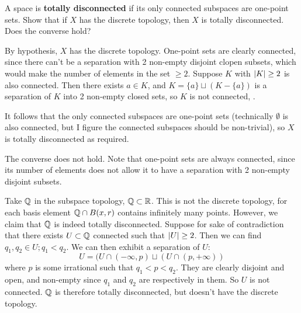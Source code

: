 \documentclass[a4paper, 12pt]{article}
\begin{document}
\begin{problem} 
    A space is \textbf{totally disconnected} if its only connected subspaces are one-point sets. Show that if $X$ has the discrete topology, then $X$ is totally disconnected. Does the converse hold?
\end{problem}
\begin{solution}
    By hypothesis, $X$ has the discrete topology. One-point sets are clearly connected, since there can't be a separation with 2 non-empty disjoint clopen subsets, which would make the number of elements in the set $\geq 2$. Suppose $K$ with $\lvert K\rvert \geq 2$ is also connected. Then there exists $a \in K$, and $K = \{a\} \sqcup (K - \{a\})$ is a separation of $K$ into 2 non-empty closed sets, so $K$ is not connected, \contra.

    It follows that the only connected subspaces are one-point sets (technically $\emptyset$ is also connected, but I figure the connected subspaces should be non-trivial), so $X$ is totally disconnected as required.




    The converse does not hold. Note that one-point sets are always connected, since its number of elements does not allow it to have a separation with 2 non-empty disjoint subsets. 
    
    Take $\mathbb{Q}$ in the subspace topology, $\mathbb{Q} \subset \mathbb{R}$. This is not the discrete topology, for each basis element $\mathbb{Q} \cap B(x, r)$ contains infinitely many points. However, we claim that $\mathbb{Q}$ is indeed totally disconnected. Suppose for sake of contradiction that there exists $U \subset \mathbb{Q}$ connected such that $\lvert U\rvert \geq 2$. Then we can find $q_1, q_2 \in U; q_1 < q_2$. We can then exhibit a separation of $U$:
    \begin{equation*}
    U = (U \cap (-\infty, p) \sqcup (U \cap (p, +\infty))
    \end{equation*}
    where $p$ is some irrational such that $q_1 < p < q_2$. They are clearly disjoint and open, and non-empty since $q_1$ and $q_2$ are respectively in them. So $U$ is not connected. $\mathbb{Q}$ is therefore totally disconnected, but doesn't have the discrete topology.
\end{solution}
\end{document}
